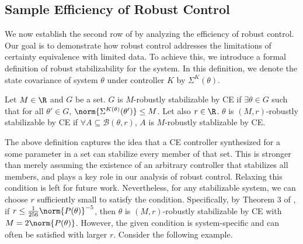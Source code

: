 \subsection{Sample Efficiency of Robust Control}
\label{s: robust control}

We now establish the second row of  by analyzing the efficiency of robust control. Our goal is to demonstrate how robust control addresses the limitations of certainty equivalence with limited data. To achieve this, we introduce a formal definition of robust stabilizability for the system. In this definition, we denote the state covariance of system $\theta$ under controller $K$ by $\Sigma^K(\theta)$. 

\begin{definition}
    Let $M\in\R$ and $G$ be a set. $G$ is $M$-robustly stabilizable by CE if $\exists \theta \in G $ such that for all $\theta' \in G$, $\norm{\Sigma^{K(\theta)}(\theta')} \leq M$. 
    Let also $r\in\R$. $\theta$ is $(M,r)$-robustly stabilizable by CE if $\forall A\subseteq\mathcal{B}(\theta, r)$, $A$ is $M$-robustly stablizable by CE. 
\end{definition}

The above definition captures the idea that a CE controller synthesized for a some parameter in a set can stabilize every member of that set. This is stronger than merely assuming the existence of an arbitrary controller that stabilizes all members, and plays a key role in our analysis of robust control. Relaxing this condition is left for future work. Nevertheless, for any stabilizable system, we can choose $r$ sufficiently small to satisfy the condition. Specifically, by Theorem 3 of \citet{simchowitz2020naive}, if $r \leq \frac{1}{256} \norm{P(\theta)}^{-5}$, then $\theta$ is $(M,r)$-robustly stabilizable by CE with $M = 2 \norm{P(\theta)}$. However, the given condition is system-specific and can often be satisfied with larger $r$.
Consider the following example.

